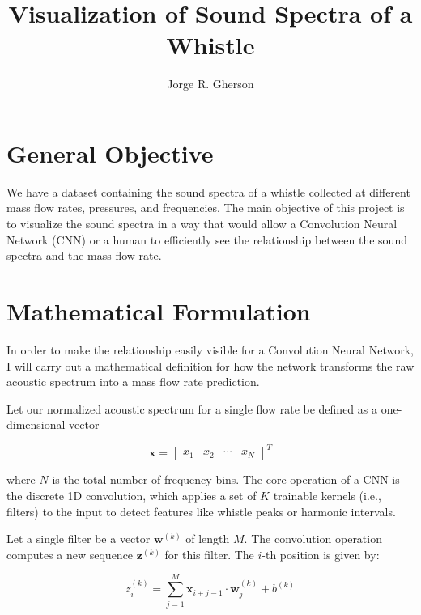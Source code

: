 \documentclass{article}
\title{Visualization of Sound Spectra of a Whistle}
\author{Jorge R. Gherson}
\begin{document}
\maketitle
\newpage 

\tableofcontents
\newpage

\section{General Objective}
We have a dataset containing the sound spectra of a whistle collected at different mass 
flow rates, pressures, and frequencies. The main objective of this project is to 
visualize the sound spectra in a way that would allow a Convolution Neural Network (CNN) 
or a human to efficiently see the relationship between the sound spectra and the 
mass flow rate. 



\newpage

\section{Mathematical Formulation}
In order to make the relationship easily visible for a Convolution 
Neural Network, I will carry out a mathematical definition for how 
the network transforms the raw acoustic spectrum into a mass flow rate prediction. 

Let our normalized acoustic spectrum for a single flow rate be 
defined as a one-dimensional vector 

\begin{equation}
        \mathbf{x} = \begin{bmatrix}
                x_1 & x_2 & \cdots & x_N
        \end{bmatrix}^T
\end{equation}

where \(N\) is the total number of frequency bins. The core operation of 
a CNN is the discrete 1D convolution, which applies a set of \(K\) 
trainable kernels (i.e., filters) to the input to detect features like 
whistle peaks or harmonic intervals. 

Let a single filter be a vector \(\mathbf{w}^{(k)}\) of length \(M\). 
The convolution operation computes a new sequence \(\mathbf{z}^{(k)}\) 
for this filter. The \(i\)-th position is given by: 

\begin{equation}
        z_i^{(k)} = \sum_{j=1}^{M} \mathbf{x}_{i+j-1}\cdot \mathbf{w}_j^{(k)} + b^{(k)}
\end{equation}
\end{document}
